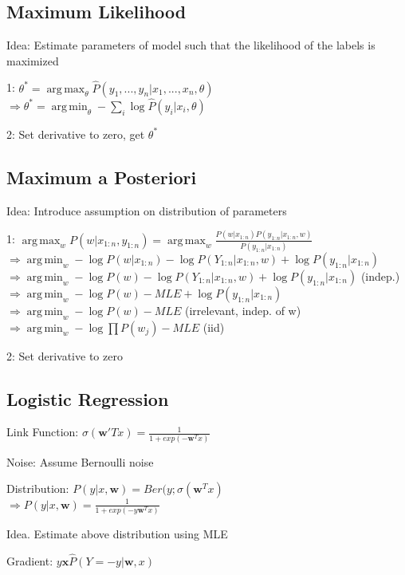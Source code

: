 \documentclass[a4paper, 11pt, landscape]{article}
\DeclareMathOperator*{\argmin}{arg\,min}
\DeclareMathOperator*{\argmax}{arg\,max}
\begin{document}
\begin{multicols*}{3}
		\subsection{Maximum Likelihood}
		\begin{compactdesc}
			\item[Idea:] Estimate parameters of model such that the likelihood of the labels is maximized
			\item[1:] $\theta^* = \argmax_\theta \hat{P}(y_1, ..., y_n | x_1, ..., x_n, \theta)$\\
			$\Rightarrow\theta^* = \argmin_\theta - \sum_{i}^{} \log \hat{P}(y_i |x_i, \theta)$
			\item[2:] Set derivative to zero, get $\theta^*$
		\end{compactdesc}
		\subsection{Maximum a Posteriori}
		\begin{compactdesc}
			\item[Idea:] Introduce assumption on distribution of parameters
			\item[1:] $\argmax_w P(w|x_{1:n}, y_{1:n}) = \argmax_w \frac{P(w|x_{1:n})P(y_{1:n}|x_{1:n}, w)}{P(y_{1:n}|x_{1:n})}$\\
			$\Rightarrow \argmin_w -\log P(w|x_{1:n}) - \log P(Y_{1:n}|x_{1:n}, w) + \log P(y_{1:n}|x_{1:n})$\\
			$\Rightarrow \argmin_w -\log P(w) - \log P(Y_{1:n}|x_{1:n}, w) + \log P(y_{1:n}|x_{1:n})$ (indep.)\\
			$\Rightarrow \argmin_w -\log P(w) - MLE + \log P(y_{1:n}|x_{1:n})$\\
			$\Rightarrow \argmin_w -\log P(w) - MLE$ (irrelevant, indep. of w)\\
			$\Rightarrow \argmin_w -\log \prod P(w_j) - MLE$ (iid)
			\item[2:] Set derivative to zero
			
		\end{compactdesc}
		\subsection{Logistic Regression}
		\begin{compactdesc}
			\item[Link Function:] $\sigma(\mathbf{w}'Tx) = \frac{1}{1 + exp(-\mathbf{w}^Tx)}$
			\item[Noise:] Assume Bernoulli noise
			\item[Distribution:] $P(y|x,\mathbf{w}) = Ber(y; \sigma(\mathbf{w}^Tx)$\\
			$\Rightarrow  P(y|x,\mathbf{w}) = \frac{1}{1 + exp(-y\mathbf{w}^Tx)}$
			\item[Idea.] Estimate above distribution using MLE
			\item[Gradient:] $y\mathbf{x}\hat{P}(Y=-y|\mathbf{w}, x)$
		\end{compactdesc}

\end{multicols*}
\end{document}
